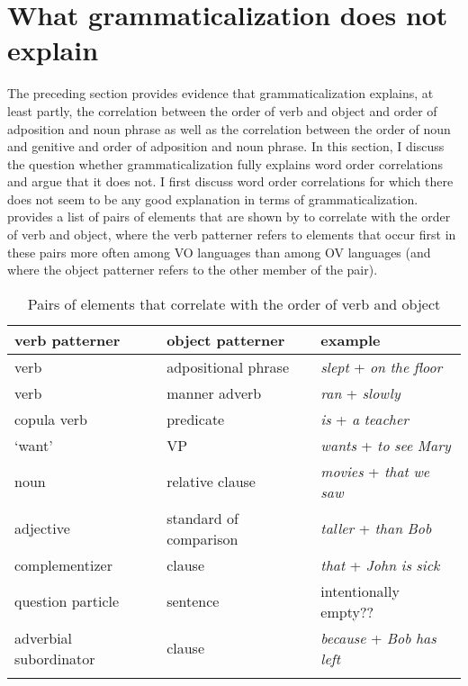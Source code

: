 \documentclass[output=paper]{langsci/langscibook}
\begin{document}
\section{What grammaticalization does not explain}\label{sec:dryer:3}

The preceding section provides evidence that grammaticalization explains, at least partly, the correlation between the order of verb and object and order of adposition and noun phrase as well as the correlation between the order of noun and genitive and order of adposition and noun phrase. In this section, I discuss the question whether grammaticalization fully explains word order correlations and argue that it does not. I first discuss word order correlations for which there does not seem to be any good explanation in terms of grammaticalization.  provides a list of pairs of elements that are shown by \citet{Dryer1992} to correlate with the order of verb and object, where the verb patterner refers to elements that occur first in these pairs more often among VO languages than among OV languages (and where the object patterner refers to the other member of the pair).

\begin{table}
\begin{tabularx}{\textwidth}{XXl}
\lsptoprule
verb patterner &  object patterner  & example\\
\midrule 
verb &  adpositional phrase  	&\textit{slept} + \textit{on} \textit{the} \textit{floor}   \\
verb & manner adverb 		& \textit{ran} + \textit{slowly}                            \\
copula verb & predicate  	&\textit{is} + \textit{a} \textit{teacher}                  \\
‘want' & VP  			&\textit{wants} + \textit{to} \textit{see} \textit{Mary}    \\
noun & relative clause  	&\textit{movies} + \textit{that} \textit{we} \textit{saw}   \\
adjective & standard of comparison  &\textit{taller} + \textit{than} \textit{Bob}           \\
complementizer &  clause  	&\textit{that} + \textit{John} \textit{is} \textit{sick}    \\
question particle & sentence     & {\color{red} intentionally empty??}                      \\
adverbial subordinator & clause & \textit{because} + \textit{Bob} \textit{has} \textit{left}\\
\lspbottomrule
\end{tabularx}

\caption{\label{tab:dryer:6}Pairs of elements that correlate with the order of verb and object}
\end{table}
\end{document}
